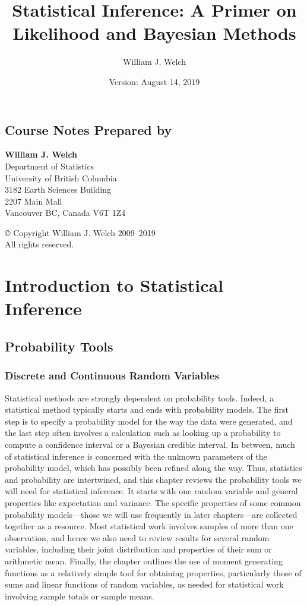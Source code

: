 \documentclass{book}
\title{Statistical Inference: A Primer on Likelihood and Bayesian Methods}
\author{William J. Welch}
\date{Version: August 14, 2019}
\begin{document}
\maketitle

\section*{Course Notes Prepared by}
\textbf{William J. Welch}\\
Department of Statistics\\
University of British Columbia\\
3182 Earth Sciences Building\\
2207 Main Mall\\
Vancouver BC, Canada V6T 1Z4

\vspace{1em}

© Copyright William J. Welch 2009--2019\\
All rights reserved.

\tableofcontents

\chapter{Introduction to Statistical Inference}

\section{Probability Tools}

\subsection{Discrete and Continuous Random Variables}
Statistical methods are strongly dependent on probability tools. Indeed, a statistical method typically starts and ends with probability models. The first step is to specify a probability model for the way the data were generated, and the last step often involves a calculation such as looking up a probability to compute a confidence interval or a Bayesian credible interval. In between, much of statistical inference is concerned with the unknown parameters of the probability model, which has possibly been refined along the way. Thus, statistics and probability are intertwined, and this chapter reviews the probability tools we will need for statistical inference. It starts with one random variable and general properties like expectation and variance. The specific properties of some common probability models—those we will use frequently in later chapters—are collected together as a resource. Most statistical work involves samples of more than one observation, and hence we also need to review results for several random variables, including their joint distribution and properties of their sum or arithmetic mean. Finally, the chapter outlines the use of moment generating functions as a relatively simple tool for obtaining properties, particularly those of sums and linear functions of random variables, as needed for statistical work involving sample totals or sample means.
\end{document}
